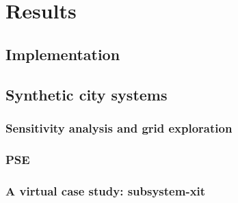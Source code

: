 \documentclass{article}
\begin{document}
\section{Results}

\subsection{Implementation}




\subsection{Synthetic city systems}

\subsubsection{Sensitivity analysis and grid exploration}


\subsubsection{PSE}


\subsubsection{A virtual case study: subsystem-xit}





\end{document}
